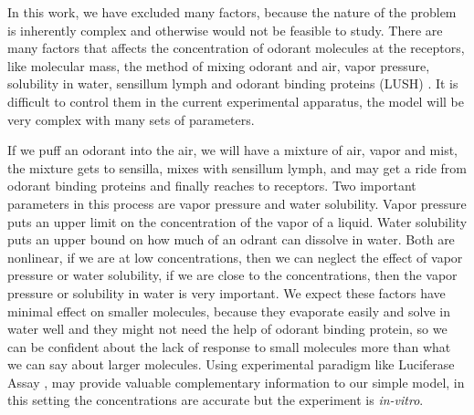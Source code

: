 \documentclass[fleqn,11pt]{wlscirep}
\begin{document}
In this work, we have excluded many factors, 
because the nature of the problem is inherently complex and otherwise would not be feasible to study. 
There are many factors that affects the concentration of odorant molecules at the receptors, 
like molecular mass, the method of mixing odorant and air, vapor pressure, solubility in water, sensillum lymph and odorant binding proteins (LUSH) \cite{xu2005drosophila,gomez2013ligands}. 
It is difficult to control them in the current experimental apparatus, 
the model will be very complex with many sets of parameters. 

If we puff an odorant into the air, we will have a mixture of air, vapor and mist, 
the mixture gets to sensilla, 
mixes with sensillum lymph, 
and may get a ride from odorant binding proteins and finally reaches to receptors. 
Two important parameters in this process are vapor pressure and water solubility. 
Vapor pressure puts an upper limit on the concentration of the vapor of a liquid. 
Water solubility puts an upper bound on how much of an odrant can dissolve in water. 
Both are nonlinear, if we are at low concentrations, 
then we can neglect the effect of vapor pressure or water solubility, 
if we are close to the concentrations, 
then the vapor pressure or solubility in water is very important. 
We expect these factors have minimal effect on smaller molecules, 
because they evaporate easily and solve in water well and they might not need the help of odorant binding protein, 
so we can be confident about the lack of response to small molecules more than what we can say about larger molecules. 
Using experimental paradigm like Luciferase Assay \cite{mainland2015human}, 
may provide valuable complementary information to our simple model, 
in this setting the concentrations are accurate but the experiment is {\it in-vitro}. 
\end{document}
